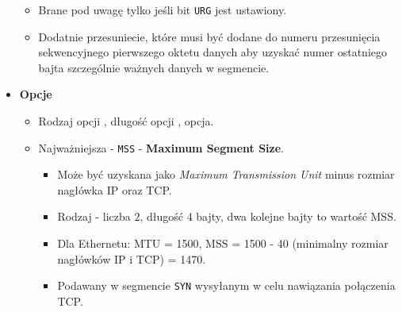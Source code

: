 \documentclass[../sk-egzamin.tex]{subfiles}
\begin{document}
\begin{itemize}
    \begin{itemize}
        \item Brane pod uwagę tylko jeśli bit \texttt{URG} jest ustawiony.
        \item Dodatnie przesuniecie, które musi być dodane do numeru
        przesunięcia sekwencyjnego pierwszego oktetu danych aby uzyskać numer
        ostatniego bajta szczególnie ważnych danych w segmencie.
    \end{itemize}
    \item \textbf{Opcje}
    \begin{itemize}
        \item Rodzaj opcji , długość opcji , opcja.
        \item Najważniejsza - \texttt{MSS} - \textbf{Maximum Segment Size}.
        \begin{itemize}
            \item Może być uzyskana jako \textit{Maximum Transmission Unit}
            minus rozmiar nagłówka IP oraz TCP.
            \item Rodzaj - liczba $2$, długość 4 bajty, dwa kolejne bajty to
            wartość MSS.
            \item Dla Ethernetu: MTU = 1500, MSS = 1500 - 40
            (minimalny rozmiar nagłówków IP i TCP) = 1470.
            \item Podawany w segmencie \texttt{SYN} wysyłanym w celu
            nawiązania połączenia TCP.
        \end{itemize}
    \end{itemize}
\end{itemize}

\pagebreak
\end{document}
